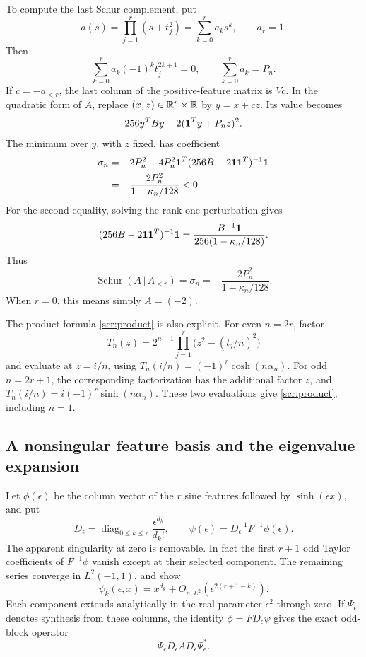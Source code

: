 To compute the last Schur complement, put
\[
 a(s)=\prod_{j=1}^r(s+t_j^2)=\sum_{k=0}^r a_ks^k,
 \qquad a_r=1.
\]
Then
\[
 \sum_{k=0}^r a_k(-1)^kt_j^{2k+1}=0,\qquad
 \sum_{k=0}^r a_k=P_n.
\]
If \(c=-a_{<r}\), the last column of the positive-feature
matrix is \(Vc\). In the quadratic form of \(A\), replace
\((x,z)\in\mathbb R^r\times\mathbb R\) by \(y=x+cz\). Its value becomes
\[
 256y^TBy-2({\bf1}^Ty+P_nz)^2.
\]
The minimum over \(y\), with \(z\) fixed, has coefficient
\begin{align*}
 \sigma_n
 &=-2P_n^2
     -4P_n^2{\bf1}^T(256B-2{\bf1}{\bf1}^T)^{-1}{\bf1}\\
 &=-\frac{2P_n^2}{1-\kappa_n/128}<0.
\end{align*}
For the second equality, solving the rank-one perturbation gives
\[
 (256B-2{\bf1}{\bf1}^T)^{-1}{\bf1}
     =\frac{B^{-1}{\bf1}}{256(1-\kappa_n/128)}.
\]
Thus
\begin{equation}\label{scr:schur}
 \operatorname{Schur}(A\,|\,A_{<r})
       =\sigma_n=-\frac{2P_n^2}{1-\kappa_n/128}.
\end{equation}
When \(r=0\), this means simply \(A=(-2)\).

The product formula \eqref{scr:product} is also explicit.
For even \(n=2r\), factor
\[
 T_n(z)=2^{n-1}\prod_{j=1}^r
                    \bigl(z^2-(t_j/n)^2\bigr)
\]
and evaluate at \(z=i/n\), using
\(T_n(i/n)=(-1)^r\cosh(n\alpha_n)\).
For odd \(n=2r+1\), the corresponding factorization has the
additional factor \(z\), and
\(T_n(i/n)=i(-1)^r\sinh(n\alpha_n)\). These two evaluations
give \eqref{scr:product}, including \(n=1\).

\subsection{A nonsingular feature basis and the eigenvalue expansion}

Let \(\phi(\epsilon)\) be the column vector of the \(r\) sine
features followed by \(\sinh(\epsilon x)\), and put
\[
 D_\epsilon=\operatorname{diag}_{0\le k\le r}
                   \frac{\epsilon^{d_k}}{d_k!},\qquad
 \psi(\epsilon)=D_\epsilon^{-1}F^{-1}\phi(\epsilon).
\]
The apparent singularity at zero is removable. In fact the first
\(r+1\) odd Taylor coefficients of \(F^{-1}\phi\) vanish
except at their selected component. The remaining series converge
in \(L^2(-1,1)\), and show
\begin{equation}\label{scr:confluent-features}
 \psi_k(\epsilon,x)
      =x^{d_k}+O_{n,L^2}(\epsilon^{2(r+1-k)}).
\end{equation}
Each component extends analytically in the real parameter
\(\epsilon^2\) through zero. If \(\Psi_\epsilon\) denotes
synthesis from these columns, the identity
\(\phi=FD_\epsilon\psi\) gives the exact odd-block operator
\begin{equation}\label{scr:operator-factor}
 \Psi_\epsilon D_\epsilon A D_\epsilon\Psi_\epsilon^*.
\end{equation}

